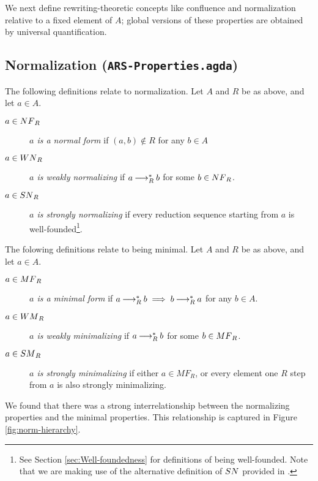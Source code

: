 We next define rewriting-theoretic concepts like confluence and normalization relative to a fixed element of $A$; global versions of these properties are obtained by universal quantification.
\subsection{Normalization (\texttt{ARS-Properties.agda})}
\begin{definition} The following definitions relate to normalization. Let $A$ and $R$ be as above, and let $a \in A$.
  \begin{description}
    \item[$a \in \NF_R$] \emph{$a$ is a normal form} if $(a,b) \notin R$ for any $b \in A$ 
    \item[$a \in \WN_R$] \emph{$a$ is weakly normalizing} if $a \mathbin{\longrightarrow_R^*} b$ for some $b \in \NF_R$.
    \item[$a \in \SN_R$]  \emph{$a$ is strongly normalizing} if every reduction sequence starting from $a$ is well-founded\footnote{See Section \ref{sec:Well-foundedness} for definitions of being well-founded. Note that we are 
    making use of the alternative definition of $\SN$ provided in \terese.}. 
  \end{description}
\end{definition} 

 
\begin{definition} The folowing definitions relate to being minimal. Let $A$ and $R$ be as above, and let $a \in A$.
    \begin{description}
        \item[$a \in \MF_R$] \emph{$a$ is a minimal form} if $a \mathbin{\longrightarrow_R^*} b \implies b \mathbin{\longrightarrow_R^*} a$ for any $b \in A$.
        \item[$a \in \WM_R$] \emph{$a$ is weakly minimalizing} if $a \mathbin{\longrightarrow_R^*} b$ for some $b \in \MF_R$.
        \item[$a \in \SM_R$]  \emph{$a$ is strongly minimalizing} if either $a \in MF_R$, or every element one $R$ step from $a$ is also strongly minimalizing.
    \end{description}
\end{definition}
We found that there was a strong interrelationship between the normalizing properties and the minimal properties. This relationship is 
captured in Figure \ref{fig:norm-hierarchy}.

